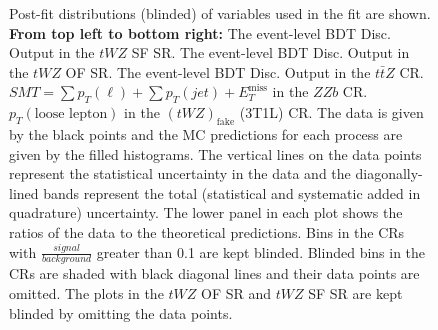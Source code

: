 \begin{figure}[htbp]
        \caption{Post-fit distributions (blinded) of variables used in the fit are shown. \textbf{From top left to bottom right:} The event-level BDT Disc. Output in the $tWZ$ SF SR. The event-level BDT Disc. Output in the $tWZ$ OF SR. The event-level BDT Disc. Output in the $t\bar{t}Z$ CR. $SMT = \sum p_{T} (\ell) + \sum p_{T} (jet) + E_{T}^{\text{miss}}$ in the $ZZb$ CR. $p_{T}(\text{loose lepton})$ in the $(tWZ)_{\text{fake}}$ (3T1L) CR. The data is given by the black points and the MC predictions for each process are given by the filled histograms. The vertical lines on the data points represent the statistical uncertainty in the data and the diagonally-lined bands represent the total (statistical and systematic added in quadrature) uncertainty. The lower panel in each plot shows the ratios of the data to the theoretical predictions. Bins in the CRs with $\frac{signal}{background}$ greater than 0.1 are kept blinded. Blinded bins in the CRs are shaded with black diagonal lines and their data points are omitted. The plots in the $tWZ$ OF SR and $tWZ$ SF SR are kept blinded by omitting the data points. }
  \label{fig:4lep-postfitPlots}
\end{figure}

